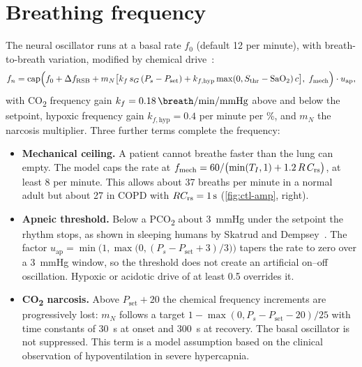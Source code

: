 \section{Breathing frequency}
\label{sec:ctl-rate}
The neural oscillator runs at a basal rate $f_0$ (default 12 per minute), with breath-to-breath variation, modified by chemical drive~\citep{duffin2000}:
\begin{equation}
f_n = \mathrm{cap}\Bigl(f_0 + \Delta f_{\mathrm{RSB}} + m_N\bigl[k_f\,s_G\,(P_s - P_{\mathrm{set}}) + k_{f,\mathrm{hyp}}\max(0,S_{\mathrm{thr}}-\mathrm{SaO_2})\,c\bigr],\;f_{\mathrm{mech}}\Bigr)\cdot u_{\mathrm{ap}},
\label{eq:ctl-rate}
\end{equation}
with CO\textsubscript{2} frequency gain $k_f = \SI{0.18}{\breath\per\minute\per\mmHg}$ above and below the setpoint, hypoxic frequency gain $k_{f,\mathrm{hyp}} = 0.4$ per minute per \%, and $m_N$ the narcosis multiplier. Three further terms complete the frequency:
\begin{itemize}[leftmargin=*]
\item \textbf{Mechanical ceiling.} A patient cannot breathe faster than the lung can empty. The model caps the rate at $f_{\mathrm{mech}} = 60/\bigl(\min(T_I,1) + 1.2\,R\,C_{\mathrm{rs}}\bigr)$, at least 8 per minute. This allows about 37 breaths per minute in a normal adult but about 27 in COPD with $RC_{\mathrm{rs}} = \SI{1}{\second}$ (\cref{fig:ctl-amp}, right).
\item \textbf{Apneic threshold.} Below a PCO\textsubscript{2} about \SI{3}{\mmHg} under the setpoint the rhythm stops, as shown in sleeping humans by Skatrud and Dempsey~\citep{skatrud1983}. The factor $u_{\mathrm{ap}} = \min\bigl(1,\max\bigl(0,(P_s - P_{\mathrm{set}} + 3)/3\bigr)\bigr)$ tapers the rate to zero over a \SI{3}{\mmHg} window, so the threshold does not create an artificial on--off oscillation. Hypoxic or acidotic drive of at least \SI{0.5}{\cmH} overrides it.
\item \textbf{CO\textsubscript{2} narcosis.} Above $P_{\mathrm{set}} + 20$ the chemical frequency increments are progressively lost: $m_N$ follows a target $1 - \max(0,P_s - P_{\mathrm{set}} - 20)/25$ with time constants of \SI{30}{\second} at onset and \SI{300}{\second} at recovery. The basal oscillator is not suppressed. This term is a model assumption based on the clinical observation of hypoventilation in severe hypercapnia.
\end{itemize}

